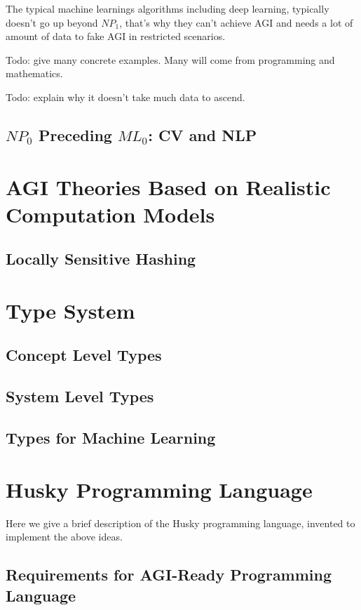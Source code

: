 \documentclass[11pt, oneside]{article}   	%
\theoremstyle{definition}
\begin{document}
The typical machine learnings algorithms including deep learning, typically doesn't go up beyond $NP_1$, that's why they can't achieve AGI and needs a lot of amount of data to fake AGI in restricted scenarios.

Todo: give many concrete examples. Many will come from programming and mathematics.

Todo: explain why it doesn't take much data to ascend.

\subsection{$NP_0$ Preceding $ML_0$: CV and NLP}


\section{AGI Theories Based on Realistic Computation Models}

\subsection{Locally Sensitive Hashing}



\section{Type System}

\subsection{Concept Level Types}


\subsection{System Level Types}

\subsection{Types for Machine Learning}

\section{Husky Programming Language}

Here we give a brief description of the Husky programming language, invented to implement the above ideas.

\subsection{Requirements for AGI-Ready Programming Language}
\end{document}
